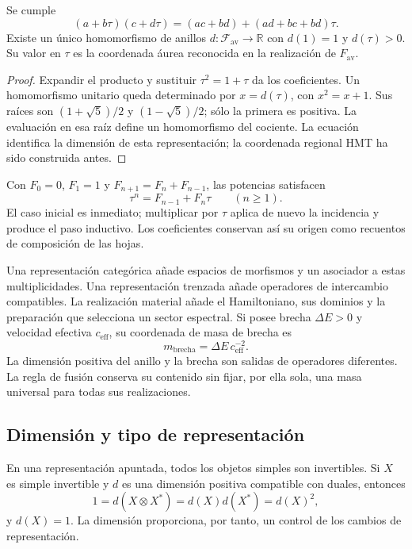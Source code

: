 \begin{proposition}
\label{vi:vi:prop:fusion-av}
Se cumple
\[
 (a+b\tau)(c+d\tau)
 =(ac+bd)+(ad+bc+bd)\tau.
\]
Existe un único homomorfismo de anillos $d:\mathcal F_{\mathrm{av}}
\to\mathbb R$ con $d(1)=1$ y $d(\tau)>0$. Su valor en $\tau$
es la coordenada áurea reconocida en la realización de $F_{\mathrm{av}}$.
\end{proposition}
\begin{proof}
Expandir el producto y sustituir $\tau^2=1+\tau$ da los coeficientes.
Un homomorfismo unitario queda determinado por $x=d(\tau)$, con
$x^2=x+1$. Sus raíces son $(1+\sqrt5)/2$ y $(1-\sqrt5)/2$;
sólo la primera es positiva. La evaluación en esa raíz define un
homomorfismo del cociente. La ecuación identifica la dimensión de esta
representación; la coordenada regional HMT ha sido construida antes.
\end{proof}

Con $F_0=0$, $F_1=1$ y $F_{n+1}=F_n+F_{n-1}$, las potencias satisfacen
\[
 \tau^n=F_{n-1}+F_n\tau\qquad(n\geq1).
\]
El caso inicial es inmediato; multiplicar por $\tau$ aplica de nuevo
la incidencia y produce el paso inductivo. Los coeficientes conservan
así su origen como recuentos de composición de las hojas.

Una representación categórica añade espacios de morfismos y un
asociador a estas multiplicidades. Una representación trenzada añade
operadores de intercambio compatibles. La realización material añade
el Hamiltoniano, sus dominios y la preparación que selecciona un
sector espectral. Si posee brecha $\Delta E>0$ y velocidad efectiva
$c_{\mathrm{eff}}$, su coordenada de masa de brecha es
\[
 m_{\mathrm{brecha}}=\Delta E\,c_{\mathrm{eff}}^{-2}.
\]
La dimensión positiva del anillo y la brecha son salidas de operadores
diferentes. La regla de fusión conserva su contenido sin fijar, por
ella sola, una masa universal para todas sus realizaciones.

\subsection{Dimensión y tipo de representación}

En una representación apuntada, todos los objetos simples son
invertibles. Si $X$ es simple invertible y $d$ es una dimensión
positiva compatible con duales, entonces
\[
 1=d(X\otimes X^*)=d(X)d(X^*)=d(X)^2,
\]
y $d(X)=1$. La dimensión proporciona, por tanto, un control de los
cambios de representación.

